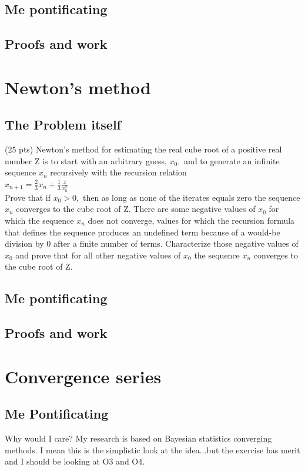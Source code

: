 \subsection{Me pontificating}


\subsection{Proofs and work}


\section{Newton's method}

\subsection{The Problem itself}
(25 pts) Newton's method for estimating the real cube root of a positive real number Z is to start with an arbitrary guess, $x_0,$ and to generate an infinite sequence ${x_n}$ recursively with the recursion relation \\ 
$x_{n+1}=\frac{2}{3}x_{n}+\frac{1}{3}\frac{z}{x_n^2}$\\ 

Prove that if $x_0 >0, $ then as long as none of the iterates equals zero the sequence ${x_n}$ converges to the cube root of Z. There are some negative values of $x_0$ for which the sequence ${x_n}$ does not converge, values for which the recursion formula that defines the sequence produces an undefined term because of a would-be division by 0 after a finite number of terms. Characterize those negative values of $x_0$ and prove that for all other negative values of $x_0$ the sequence ${x_n}$ converges to the cube root of Z.

\subsection{Me pontificating}

\subsection{Proofs and work }


\section{Convergence series}


\subsection{Me Pontificating}
Why would I care? My research is based on Bayesian statistics converging methods. I mean this is the simplistic look at the idea...but the exercise has merit and I should be looking at O3 and O4.  
